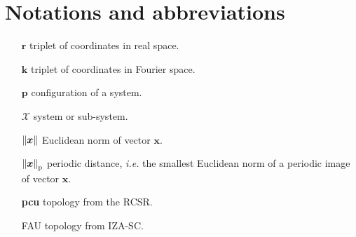 \section*{Notations and abbreviations}
\begin{itemize}
    \item[$\boldsymbol r$] triplet of coordinates in real space.
    \item[$\boldsymbol k$] triplet of coordinates in Fourier space.
    \item[$\boldsymbol p$] configuration of a system.
    \item[$\mathcal X$] system or sub-system.
    \item[$\left\|\boldsymbol x\right\|$] Euclidean norm of vector $\boldsymbol x$.
    \item[$\left\|\boldsymbol x\right\|_\text{p}$] periodic distance, \textit{i.e.} the smallest Euclidean norm of a periodic image of vector $\boldsymbol x$.
    \item[\bfseries{pcu}] topology from the RCSR.
    \item[FAU] topology from IZA-SC.
\end{itemize}
